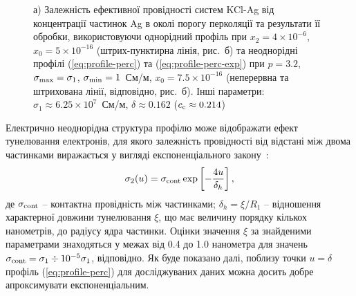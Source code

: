 \documentclass[14pt,twoside]{vakthesis}
\begin{document}
\begin{figure}[tb]
\begin{subfigure}[c]{0.49\textwidth}
		\caption{} \label{fig:KCl-Ag-rhob}
	\end{subfigure}
	\caption{\label{fig:KCl-Ag-rho}
		а) Залежність ефективної провідності систем KCl-Ag \cite{ChenI.-G.1986} від концентрації частинок Ag в околі порогу перколяції та результати її обробки, використовуючи однорідний профіль при $x_2 = 4\times 10^{-6}$, $x_0 = 5 \times 10^{-16}$ (штрих-пунктирна лінія, рис.~б) та неоднорідні профілі (\ref{eq:profile-perc}) та (\ref{eq:profile-perc-exp}) при $p=3.2$, $\sigma_{\rm max} = \sigma_1$, $\sigma_{\rm min} = 1$~См/м, $x_0 = 7.5\times 10^{-16}$ (неперервна та штрихована лінії, відповідно, рис.~б).
		Інші параметри: $\sigma_1 \approx 6.25 \times 10^7 $~См/м, $\delta \approx 0.162$ ($c_{\rm c} \approx 0.214$)}
	\vspace{-10pt}
\end{figure}

Електрично неоднорідна структура профілю може відображати ефект тунелювання електронів, для якого залежність провідності від відстані між двома частинками виражається у вигляді експоненціального закону~\cite{Balberg1987}:
\begin{equation}\label{eq:profile-tunneling}
	\sigma_2 (u) = \sigma_{\rm cont} \exp \left[ - \frac{4u}{\delta_h} \right] ,
\end{equation}
де $\sigma_{\rm cont}$ -- контактна провідність між частинками; $\delta_h = \xi / R_1 $ -- відношення характерної довжини тунелювання $\xi$, що має величину порядку кількох нанометрів, до радіусу ядра частинки. Оцінки значення $\xi$ за знайденими параметрами знаходяться у межах від 0.4 до 1.0 нанометра для значень $\sigma_{\rm cont} = \sigma_1\div 10^{-5}\sigma_1$, відповідно. Як буде показано далі, поблизу точки $u=\delta$ профіль (\ref{eq:profile-perc}) для досліджуваних даних можна досить добре апроксимувати експоненціальним.
\end{document}
